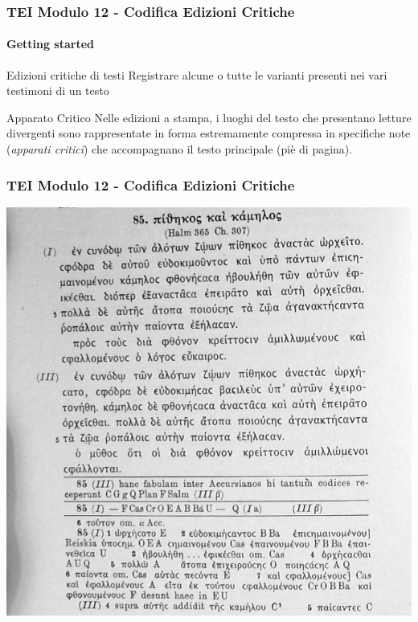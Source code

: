 






\begin{frame}
    \frametitle{TEI Modulo 12 - Codifica Edizioni Critiche}
    \framesubtitle{Getting started}
    \addtocounter{nframe}{1}





    \begin{block}{Edizioni critiche di testi}
        Registrare alcune o tutte le varianti presenti nei vari testimoni di un testo
    \end{block}

    \begin{block}{Apparato Critico}
       Nelle edizioni a stampa, i luoghi del testo che presentano letture divergenti sono rappresentate in forma estremamente compressa in specifiche note (\textit{apparati critici}) che accompagnano il testo principale (piè di pagina).
    \end{block}

\end{frame}

\begin{frame}
    \frametitle{TEI Modulo 12 - Codifica Edizioni Critiche}
    \addtocounter{nframe}{1}
    
    \begin{center}
        \includegraphics[width=.7\textwidth]{imgs/Edizione-Critica-apparato.png}
    \end{center}

\end{frame}



